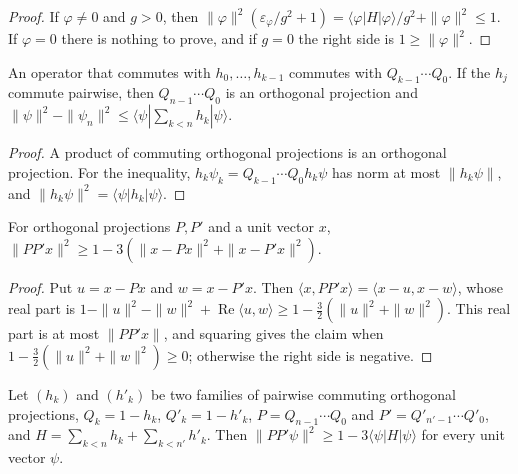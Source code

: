\begin{proof}
    \leanok
    If $\varphi\ne0$ and $g>0$, then
    $\|\varphi\|^2(\varepsilon_\varphi/g^2+1)
        =\langle\varphi|H|\varphi\rangle/g^2+\|\varphi\|^2\le1$. If
    $\varphi=0$ there is nothing to prove, and if $g=0$ the right side is
    $1\ge\|\varphi\|^2$.
\end{proof}

\begin{theorem}
    \label{thm:commuting_complement_product}
    \leanok
    An operator that commutes with $h_0,\dots,h_{k-1}$ commutes with
    $Q_{k-1}\cdots Q_0$. If the $h_j$ commute pairwise, then
    $Q_{n-1}\cdots Q_0$ is an orthogonal projection and
    $\|\psi\|^2-\|\psi_n\|^2\le\langle\psi|\sum_{k<n}h_k|\psi\rangle$.
\end{theorem}

\begin{proof}
    \leanok
    A product of commuting orthogonal projections is an orthogonal
    projection. For the inequality, $h_k\psi_k=Q_{k-1}\cdots Q_0h_k\psi$
    has norm at most $\|h_k\psi\|$, and
    $\|h_k\psi\|^2=\langle\psi|h_k|\psi\rangle$.
\end{proof}

\begin{theorem}
    \label{thm:two_projection_product}
    \leanok
    For orthogonal projections $P,P'$ and a unit vector $x$,
    $\|PP'x\|^2\ge1-3(\|x-Px\|^2+\|x-P'x\|^2)$.
\end{theorem}

\begin{proof}
    \leanok
    Put $u=x-Px$ and $w=x-P'x$. Then
    $\langle x,PP'x\rangle=\langle x-u,x-w\rangle$, whose real part is
    $1-\|u\|^2-\|w\|^2+\operatorname{Re}\langle u,w\rangle
        \ge1-\tfrac32(\|u\|^2+\|w\|^2)$. This real part is at most
    $\|PP'x\|$, and squaring gives the claim when
    $1-\tfrac32(\|u\|^2+\|w\|^2)\ge0$; otherwise the right side is negative.
\end{proof}

\begin{theorem}
    \label{thm:detectability_lemma_converse}
    \leanok
    Let $(h_k)$ and $(h'_k)$ be two families of pairwise commuting
    orthogonal projections, $Q_k=1-h_k$, $Q'_k=1-h'_k$,
    $P=Q_{n-1}\cdots Q_0$ and $P'=Q'_{n'-1}\cdots Q'_0$, and $H=\sum_{k<n}h_k+\sum_{k<n'}h'_k$. Then
    $\|PP'\psi\|^2\ge1-3\langle\psi|H|\psi\rangle$ for every unit vector
    $\psi$.
\end{theorem}

